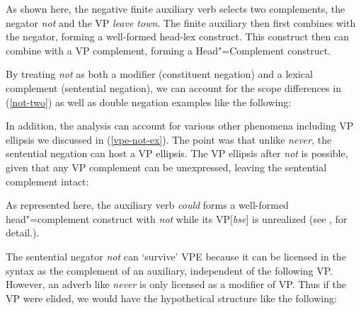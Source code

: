 \documentclass[output=paper]{langsci/langscibook}
\begin{document}
{\begin{exe}
\begin{xlist}
\begin{exe}
\begin{xlist}
\medskip
\noindent As shown here, the negative finite auxiliary verb
 selects two complements, the negator \emph{not} and the
VP \emph{leave town}. The finite auxiliary then first combines with
the negator, forming a well-formed head-lex construct. This construct
then can combine with a VP complement, forming a Head"=Complement
construct.

By treating \emph{not} as both a modifier (constituent negation)
and a lexical complement (sentential negation), we can
account for
the scope differences in (\ref{not-two}) as well as double
negation examples like the following:

\eal
{}

\zl
%

In addition, the analysis can account for various other phenomena
including VP ellipsis we discussed in (\ref{vpe-not-ex}). The point
was that unlike \emph{never}, the sentential negation can
host a VP ellipsis.  The VP ellipsis after \emph{not} is
possible, given that any VP complement can be unexpressed, leaving
the sentential complement intact:

\ea {}
\z
%
As represented here, the auxiliary verb \emph{could} forms a
well-formed head"=complement construct with \emph{not} while its
VP[\emph{bse}] is unrealized (see \citet{Kim:00}, \citet{KS:08} for
detail.).

The sentential negator \emph{not} can `survive' VPE because it can be
licensed in the syntax as the complement of an auxiliary, independent
of the following VP.  However, an adverb like \emph{never} is only
licensed as a modifier of VP. Thus if the VP were elided, we would have the hypothetical
structure like the following:


\end{xlist}
\end{exe}
\end{xlist}
\end{exe}}
\end{document}
